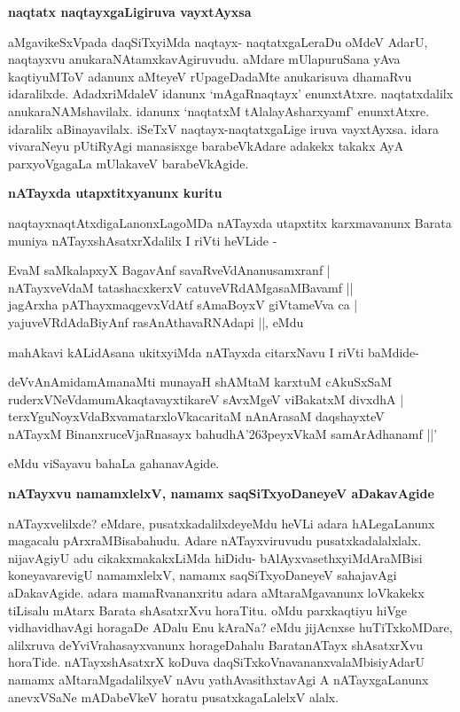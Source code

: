 {\bigskip
\noindent
{\large\bf naqtatx naqtayxgaLigiruva vayxtAyxsa}}\label{page242b}
\medskip

\noindent
aMgavikeSxVpada daqSiTxyiMda naqtayx- naqtatxgaLeraDu oMdeV AdarU, naqtayxvu anukaraNAtamxkavAgiruvudu. aMdare mUlapuruSana yAva kaqtiyuMToV adanunx aMteyeV rUpageDadaMte anukarisuva dhamaRvu idaralilxde. AdadxriMdaleV idanunx `mAgaRnaqtayx' enunxtAtxre. naqtatxdalilx anukaraNAMshavilalx. idanunx `naqtatxM tAlalayAsharxyamf' enunxtAtxre. idaralilx aBinayavilalx. iSeTxV naqtayx-naqtatxgaLige iruva vayxtAyxsa. idara vivaraNeyu pUtiRyAgi manasisxge barabeVkAdare adakekx takakx AyA parxyoVgagaLa mUlakaveV barabeVkAgide.

{\bigskip
\noindent
{\large\bf nATayxda utapxtitxyanunx kuritu}}\label{page242}
\medskip

\noindent
naqtayxnaqtAtxdigaLanonxLagoMDa nATayxda utapxtitx karxmavanunx Barata muniya nATayxshAsatxrXdalilx I riVti heVLide -

\begin{shloka}
EvaM saMkalapxyX BagavAnf savaRveVdAnanusamxranf |\\\label{242}
nATayxveVdaM tatashacxkerxV catuveVRdAMgasaMBavamf ||\\
jagArxha pAThayxmaqgevxVdAtf sAmaBoyxV giVtameVva ca |\\
yajuveVRdAdaBiyAnf rasAnAthavaRNAdapi ||, eMdu
\end{shloka}

\noindent
mahAkavi kALidAsana ukitxyiMda nATayxda citarxNavu I riVti baMdide-

\begin{shloka}
deVvAnAmidamAmanaMti munayaH shAMtaM karxtuM cAkuSxSaM\\\label{242a}
ruderxVNeVdamumAkaqtavayxtikareV sAvxMgeV viBakatxM divxdhA |\\
terxYguNoyxVdaBxvamatarxloVkacaritaM nAnArasaM daqshayxteV\\
nATayxM BinanxruceVjaRnasayx bahudhA\char'263peyxVkaM samArAdhanamf ||'
\end{shloka}

\noindent
eMdu viSayavu bahaLa gahanavAgide.

\vfill\eject

{\noindent
{\large\bf nATayxvu namamxlelxV, namamx saqSiTxyoDaneyeV aDakavAgide}}\label{page242a}
\medskip

\noindent
nATayxvelilxde? eMdare, pusatxkadalilxdeyeMdu heVLi adara hALegaLanunx magacalu pArxraMBisabahudu. Adare nATayxviruvudu pusatxkadalalxlalx. nijavAgiyU adu cikakxmakakxLiMda hiDidu- bAlAyxvasethxyiMdAraMBisi koneyavarevigU namamxlelxV, namamx saqSiTxyoDaneyeV sahajavAgi aDakavAgide. adara mamaRvananxritu adara aMtaraMgavanunx loVkakekx tiLisalu mAtarx Barata shAsatxrXvu horaTitu. oMdu parxkaqtiyu hiVge vidhavidhavAgi horagaDe ADalu Enu kAraNa? eMdu jijAcnxse huTiTxkoMDare, alilxruva deYviVrahasayxvanunx horageDahalu BaratanATayx shAsatxrXvu horaTide. nATayxshAsatxrX koDuva daqSiTxkoVnavananxvalaMbisiyAdarU namamx aMtaraMgadalilxyeV nAvu yathAvasithxtavAgi A nATayxgaLanunx anevxVSaNe mADabeVkeV horatu pusatxkagaLalelxV alalx.

